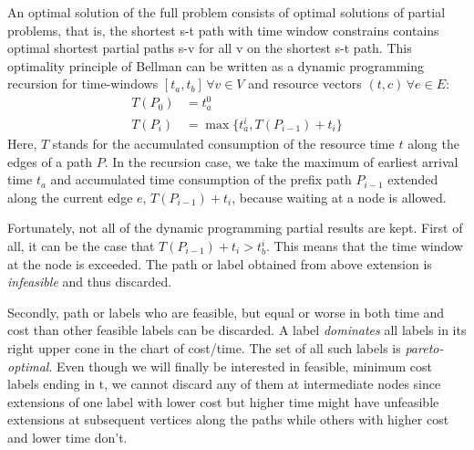 An optimal solution of the full problem consists of optimal solutions of partial problems, that is, the shortest s-t path with time window constrains contains optimal shortest partial paths s-v for all v on the shortest s-t path. This optimality principle of Bellman \cite{bellman1957dynamic} can be written as a dynamic programming recursion for time-windows $[t_a,t_b] \, \forall v \in V$ and resource vectors $(t,c) \, \forall e \in E$:
\begin{align*}
	T(P_0) &= t_a^0 \\
	T(P_i) &= \max\{t_a^i, T(P_{i-1}) + t_i\}
\end{align*}
Here, $T$ stands for the accumulated consumption of the resource time $t$ along the edges of a path $P$. In the recursion case, we take the maximum of earliest arrival time $t_a$ and accumulated time consumption of the prefix path $P_{i-1}$ extended along the current edge $e$, $T(P_{i-1}) + t_i$, because waiting at a node is allowed.

Fortunately, not all of the dynamic programming partial results are kept. First of all, it can be the case that $T(P_{i-1}) + t_i > t_b^i$. This means that the time window at the node is exceeded. The path or label obtained from above extension is \textit{infeasible} and thus discarded.

Secondly, path or labels who are feasible, but equal or worse in both time and cost than other feasible labels can be discarded. A label \textit{dominates} all labels in its right upper cone in the chart of cost/time. The set of all such labels is \textit{pareto-optimal}. Even though we will finally be interested in feasible, minimum cost labels ending in t, we cannot discard any of them at intermediate nodes since extensions of one label with lower cost but higher time might have unfeasible extensions at subsequent vertices along the paths while others with higher cost and lower time don't. 


